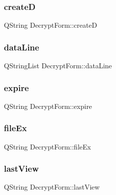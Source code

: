 \subsubsection{\texorpdfstring{createD}{createD}}
{\footnotesize\ttfamily Q\+String Decrypt\+Form\+::createD\hspace{0.3cm}{\ttfamily [protected]}}

\hypertarget{class_decrypt_form_a16c208fef98e40521b962932602ce0ff}{}\label{class_decrypt_form_a16c208fef98e40521b962932602ce0ff} 
\subsubsection{\texorpdfstring{data\+Line}{dataLine}}
{\footnotesize\ttfamily Q\+String\+List Decrypt\+Form\+::data\+Line\hspace{0.3cm}{\ttfamily [protected]}}

\hypertarget{class_decrypt_form_ac0a3281de07c0e2b461652ce12b1ada2}{}\label{class_decrypt_form_ac0a3281de07c0e2b461652ce12b1ada2} 
\subsubsection{\texorpdfstring{expire}{expire}}
{\footnotesize\ttfamily Q\+String Decrypt\+Form\+::expire\hspace{0.3cm}{\ttfamily [protected]}}

\hypertarget{class_decrypt_form_a948100789ce9a1613fc4e028609d7f7d}{}\label{class_decrypt_form_a948100789ce9a1613fc4e028609d7f7d} 
\subsubsection{\texorpdfstring{file\+Ex}{fileEx}}
{\footnotesize\ttfamily Q\+String Decrypt\+Form\+::file\+Ex\hspace{0.3cm}{\ttfamily [protected]}}

\hypertarget{class_decrypt_form_a64370269794155fc85fafa42a1d31913}{}\label{class_decrypt_form_a64370269794155fc85fafa42a1d31913} 
\subsubsection{\texorpdfstring{last\+View}{lastView}}
{\footnotesize\ttfamily Q\+String Decrypt\+Form\+::last\+View\hspace{0.3cm}{\ttfamily [protected]}}

